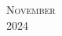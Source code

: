 \documentclass[10pt]{article} %
\begin{document}


\begin{center}
	\textsc{\LARGE November}\\ %
	\textsc{\large 2024} %
\end{center}


\begin{calendar}{\textwidth} %





\BlankDay
\BlankDay
\BlankDay
\BlankDay
\BlankDay



\end{calendar}
\end{document}
